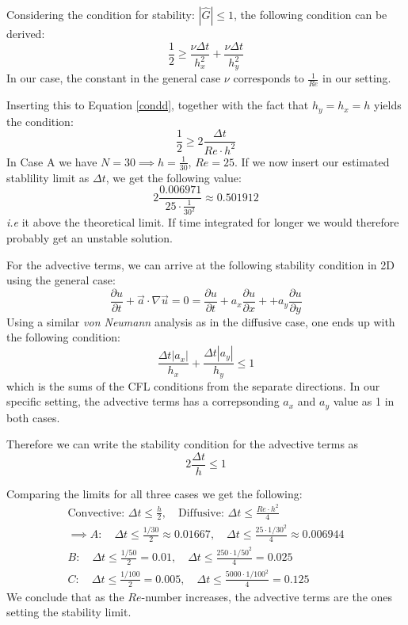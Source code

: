 \documentclass[10pt]{report}
\newcommand{\dt}{\Delta t}
\newcommand{\p}{\partial}
\begin{document}
Considering the condition for stability: $|\hat{G}| \le 1$, the following condition can be derived:
\begin{equation}
    \frac{1}{2} \ge \frac{\nu \dt}{h_x^2} + \frac{\nu \dt}{h_y^2} \label{condd}
\end{equation}
In our case, the constant in the general case $\nu$ corresponds to $\frac{1}{Re}$ in our setting.

Inserting this to Equation \ref{condd}, together with the fact that $h_y = h_x = h$ yields the condition:
\begin{equation}
    \frac{1}{2} \ge 2\frac{\dt}{Re \cdot h^2}
\end{equation}
In Case A we have $N = 30 \implies h = \frac{1}{30}$, $Re = 25$. If we now insert our estimated stablility limit as $\dt$,
we get the following value:
\[
    2\frac{0.006971}{25 \cdot \frac{1}{30^2}} \approx 0.501912
\]
\textit{i.e} it above the theoretical limit. If time integrated for longer we would therefore probably get an unstable solution.

For the advective terms, we can arrive at the following stability condition in 2D using the general case:
\begin{equation*}
    \frac{\p u}{\p t} + \vec{a}\cdot \nabla \vec{u} = 0 = \frac{\p u}{\p t} + a_x \frac{\p u}{\p x} + + a_y \frac{\p u}{\p y}
\end{equation*}
Using a similar \textit{von Neumann} analysis as in the diffusive case, one ends up with the following condition:
\begin{equation}
    \frac{\dt |a_x|}{h_x} + \frac{\dt |a_y|}{h_y} \le 1 
\end{equation}
which is the sums of the CFL conditions from the separate directions. In our specific setting, the advective terms
has a correpsonding $a_x$ and $a_y$ value as 1 in both cases.

Therefore we can write the stability condition for the advective terms as\[
    2\frac{\dt}{h} \le 1
\]

Comparing the limits for all three cases we get the following:
\begin{gather*}
    \text{Convective:  } \dt \le \frac{h}{2},\quad \text{Diffusive:  }\dt \le \frac{Re \cdot h^2}{4}\\
    \implies A: \quad \dt \le \frac{1/30}{2} \approx 0.01667,\quad \dt \le \frac{25\cdot 1/30^2}{4} \approx 0.006944\\
    B: \quad \dt \le \frac{1/50}{2} = 0.01,\quad \dt \le \frac{250\cdot 1/50^2}{4} = 0.025\\
    C:\quad \dt \le \frac{1/100}{2} = 0.005,\quad \dt \le \frac{5000\cdot 1/100^2}{4} = 0.125
\end{gather*}
We conclude that as the $Re$-number increases, the advective terms are the ones setting the stability limit.
\end{document}
